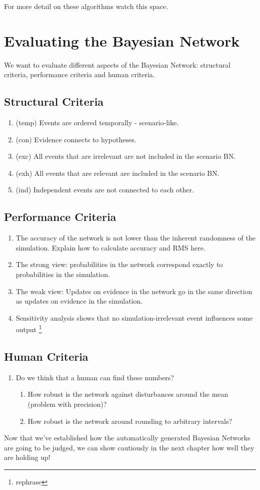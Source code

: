 For more detail on these algorithms watch this space.




\section{Evaluating the Bayesian Network}

We want to evaluate different aspects of the Bayesian Network: structural criteria, performance criteria and human criteria.

\subsection{Structural Criteria}
\begin{enumerate}
\item (temp) Events are ordered temporally - scenario-like.
\item (con) Evidence connects to hypotheses.
\item (exc) All events that are irrelevant are not included in the scenario BN.
\item (exh) All events that are relevant are included in the scenario BN.
\item (ind) Independent events are not connected to each other.
\end{enumerate}

\subsection{Performance Criteria}
\begin{enumerate}
\item The accuracy of the network is not lower than the inherent randomness of the simulation. Explain how to calculate accuracy and RMS here.
\item The strong view: probabilities in the network correspond exactly to probabilities in the simulation.
\item The weak view: Updates on evidence in the network go in the same direction as updates on evidence in the simulation.
\item Sensitivity analysis shows that no simulation-irrelevant event influences some output \footnote{rephrase}
\end{enumerate}

\subsection{Human Criteria}
\begin{enumerate}
\item Do we think that a human can find these numbers?
	\begin{enumerate}
	\item How robust is the network against disturbances around the mean (problem with precision)?
	\item How robust is the network around rounding to arbitrary intervals?
	\end{enumerate}
\end{enumerate}

Now that we've established how the automatically generated Bayesian Networks are going to be judged, we can show cautiously in the next chapter how well they are holding up!


